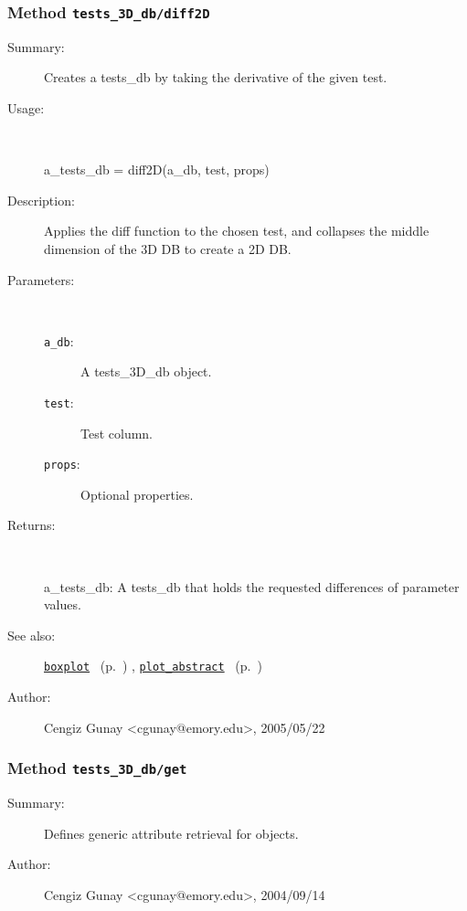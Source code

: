 \subsubsection[Method \texttt{diff2D}]{Method \texttt{tests\_3D\_db/diff2D}}%
%
\label{ref_tests_3D_db__diff2D}%
\hypertarget{ref_tests_3D_db__diff2D}{}%
\begin{description}
\item[Summary:]Creates a tests\_db by taking the derivative of the given test.
%
\item[Usage:]~%
\begin{lyxcode}%
a\_tests\_db = diff2D(a\_db, test, props)
%
\end{lyxcode}%
%
\item[Description:]%
Applies the diff function to the chosen test, and collapses the middle
 dimension of the 3D DB to create a 2D DB.
\item[Parameters:]~
\begin{description}%
\item[\texttt{a\_db}:]
 A tests\_3D\_db object.
\item[\texttt{test}:]
 Test column.
\item[\texttt{props}:]
 Optional properties.
\end{description}%
%
\item[Returns:]~

	a\_tests\_db: A tests\_db that holds the requested differences of parameter values.
%
%
\item[See also:]%
\hyperlink{ref_boxplot}{\texttt{boxplot}}%
\ (p.~\pageref{ref_boxplot})%
%
, \hyperlink{ref_plot_abstract}{\texttt{plot\_abstract}}%
\ (p.~\pageref{ref_plot_abstract})%
%
%
\item[Author:]%
Cengiz Gunay <cgunay@emory.edu>, 2005/05/22%
\end{description}
\methodline%
\subsubsection[Method \texttt{get}]{Method \texttt{tests\_3D\_db/get}}%
%
\label{ref_tests_3D_db__get}%
\hypertarget{ref_tests_3D_db__get}{}%
\begin{description}
\item[Summary:]Defines generic attribute retrieval for objects.
%
%
%
%
%
%
%
\item[Author:]%
Cengiz Gunay <cgunay@emory.edu>, 2004/09/14%
\end{description}
\methodline%
